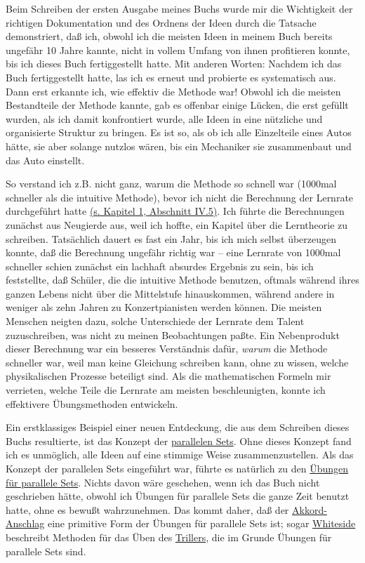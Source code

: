 Beim Schreiben der ersten Ausgabe meines Buchs wurde mir die Wichtigkeit der richtigen Dokumentation und des Ordnens der Ideen durch die Tatsache demonstriert, daß ich, obwohl ich die meisten Ideen in meinem Buch bereits ungefähr 10 Jahre kannte, nicht in vollem Umfang von ihnen profitieren konnte, bis ich dieses Buch fertiggestellt hatte.
Mit anderen Worten: Nachdem ich das Buch fertiggestellt hatte, las ich es erneut und probierte es systematisch aus.
Dann erst erkannte ich, wie effektiv die Methode war!
Obwohl ich die meisten Bestandteile der Methode kannte, gab es offenbar einige Lücken, die erst gefüllt wurden, als ich damit konfrontiert wurde, alle Ideen in eine nützliche und organisierte Struktur zu bringen.
Es ist so, als ob ich alle Einzelteile eines Autos hätte, sie aber solange nutzlos wären, bis ein Mechaniker sie zusammenbaut und das Auto einstellt.

So verstand ich z.B. nicht ganz, warum die Methode so schnell war (1000mal schneller als die intuitive Methode), bevor ich nicht die Berechnung der Lernrate durchgeführt hatte \hyperref[c1iv5]{(s. Kapitel 1, Abschnitt IV.5)}.
Ich führte die Berechnungen zunächst aus Neugierde aus, weil ich hoffte, ein Kapitel über die Lerntheorie zu schreiben.
Tatsächlich dauert es fast ein Jahr, bis ich mich selbst überzeugen konnte, daß die Berechnung ungefähr richtig war -- eine Lernrate von 1000mal schneller schien zunächst ein lachhaft absurdes Ergebnis zu sein, bis ich feststellte, daß Schüler, die die intuitive Methode benutzen, oftmals während ihres ganzen Lebens nicht über die Mittelstufe hinauskommen, während andere in weniger als zehn Jahren zu Konzertpianisten werden können.
Die meisten Menschen neigten dazu, solche Unterschiede der Lernrate dem Talent zuzuschreiben, was nicht zu meinen Beobachtungen paßte.
Ein Nebenprodukt dieser Berechnung war ein besseres Verständnis dafür, \textit{warum} die Methode schneller war, weil man keine Gleichung schreiben kann, ohne zu wissen, welche physikalischen Prozesse beteiligt sind.
Als die mathematischen Formeln mir verrieten, welche Teile die Lernrate am meisten beschleunigten, konnte ich effektivere Übungsmethoden entwickeln.

Ein erstklassiges Beispiel einer neuen Entdeckung, die aus dem Schreiben dieses Buchs resultierte, ist das Konzept der \hyperref[c1ii11]{parallelen Sets}.
Ohne dieses Konzept fand ich es unmöglich, alle Ideen auf eine stimmige Weise zusammenzustellen.
Als das Konzept der parallelen Sets eingeführt war, führte es natürlich zu den \hyperref[c1iii7b]{Übungen für parallele Sets}.
Nichts davon wäre geschehen, wenn ich das Buch nicht geschrieben hätte, obwohl ich Übungen für parallele Sets die ganze Zeit benutzt hatte, ohne es bewußt wahrzunehmen.
Das kommt daher, daß der \hyperref[c1ii9]{Akkord-Anschlag} eine primitive Form der Übungen für parallele Sets ist; sogar \hyperref[Whiteside]{Whiteside} beschreibt Methoden für das Üben des \hyperref[c1iii3]{Trillers}, die im Grunde Übungen für parallele Sets sind.


